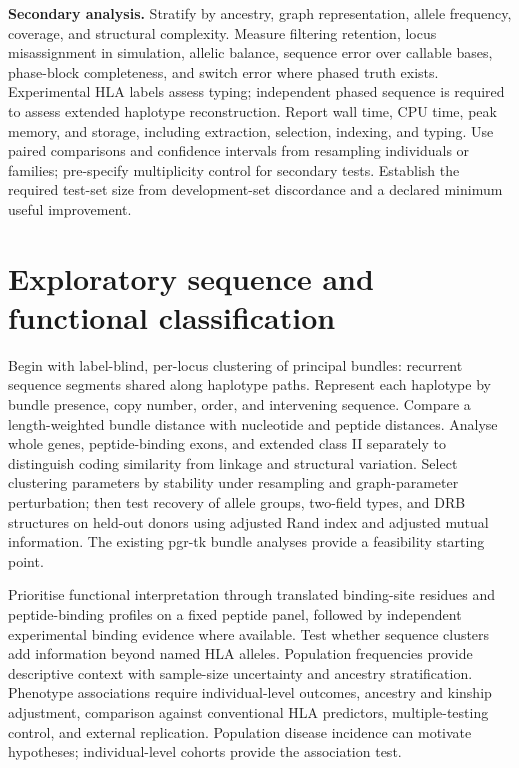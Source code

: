 \documentclass[10pt,a4paper]{article}
\begin{document}
\textbf{Secondary analysis.}
Stratify by ancestry, graph representation, allele frequency, coverage, and
structural complexity. Measure filtering retention, locus misassignment in
simulation, allelic balance, sequence error over callable bases, phase-block
completeness, and switch error where phased truth exists. Experimental HLA
labels assess typing; independent phased sequence is required to assess extended
haplotype reconstruction. Report wall time, CPU time, peak memory, and storage,
including extraction, selection, indexing, and typing. Use paired comparisons
and confidence intervals from resampling individuals or families; pre-specify
multiplicity control for secondary tests. Establish the required test-set size
from development-set discordance and a declared minimum useful improvement.

\section{Exploratory sequence and functional classification}
Begin with label-blind, per-locus clustering of principal bundles: recurrent
sequence segments shared along haplotype paths. Represent each haplotype by
bundle presence, copy number, order, and intervening sequence. Compare a
length-weighted bundle distance with nucleotide and peptide distances. Analyse
whole genes, peptide-binding exons, and extended class II separately to distinguish
coding similarity from linkage and structural variation. Select clustering
parameters by stability under resampling and graph-parameter perturbation;
then test recovery of allele groups, two-field types, and DRB structures on
held-out donors using adjusted Rand index and adjusted mutual information.
The existing pgr-tk bundle analyses provide a feasibility starting point.

Prioritise functional interpretation through translated binding-site residues
and peptide-binding profiles on a fixed peptide panel, followed by independent
experimental binding evidence where available. Test whether sequence clusters
add information beyond named HLA alleles. Population frequencies provide
descriptive context with sample-size uncertainty and ancestry stratification.
Phenotype associations require individual-level outcomes, ancestry and kinship
adjustment, comparison against conventional HLA predictors, multiple-testing
control, and external replication. Population disease incidence can motivate
hypotheses; individual-level cohorts provide the association test.
\end{document}
